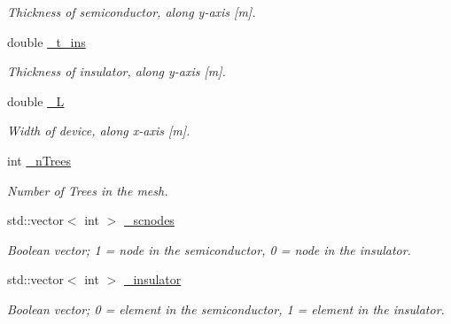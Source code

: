 \begin{DoxyCompactItemize}
\begin{DoxyCompactList}\small\item\em Thickness of semiconductor, along y-\/axis \mbox{[}m\mbox{]}. \end{DoxyCompactList}\item 
\mbox{\label{class_probl_a134179787ded931e9c2bad46e43563ca}} 
double \mbox{\hyperlink{class_probl_a134179787ded931e9c2bad46e43563ca}{\+\_\+t\+\_\+ins}}
\begin{DoxyCompactList}\small\item\em Thickness of insulator, along y-\/axis \mbox{[}m\mbox{]}. \end{DoxyCompactList}\item 
\mbox{\label{class_probl_a5557e696aaf41becde0e346b4389136d}} 
double \mbox{\hyperlink{class_probl_a5557e696aaf41becde0e346b4389136d}{\+\_\+L}}
\begin{DoxyCompactList}\small\item\em Width of device, along x-\/axis \mbox{[}m\mbox{]}. \end{DoxyCompactList}\item 
\mbox{\label{class_probl_a59ad6b6c51ba6229118f0c408902aecd}} 
int \mbox{\hyperlink{class_probl_a59ad6b6c51ba6229118f0c408902aecd}{\+\_\+n\+Trees}}
\begin{DoxyCompactList}\small\item\em Number of Trees in the mesh. \end{DoxyCompactList}\item 
\mbox{\label{class_probl_ab1617f0da567c270428c1822f94f880c}} 
std\+::vector$<$ int $>$ \mbox{\hyperlink{class_probl_ab1617f0da567c270428c1822f94f880c}{\+\_\+scnodes}}
\begin{DoxyCompactList}\small\item\em Boolean vector; 1 = node in the semiconductor, 0 = node in the insulator. \end{DoxyCompactList}\item 
\mbox{\label{class_probl_a7ab8fbd54730f9963467850348056475}} 
std\+::vector$<$ int $>$ \mbox{\hyperlink{class_probl_a7ab8fbd54730f9963467850348056475}{\+\_\+insulator}}
\begin{DoxyCompactList}\small\item\em Boolean vector; 0 = element in the semiconductor, 1 = element in the insulator. \end{DoxyCompactList}\item 

\end{DoxyCompactItemize}
